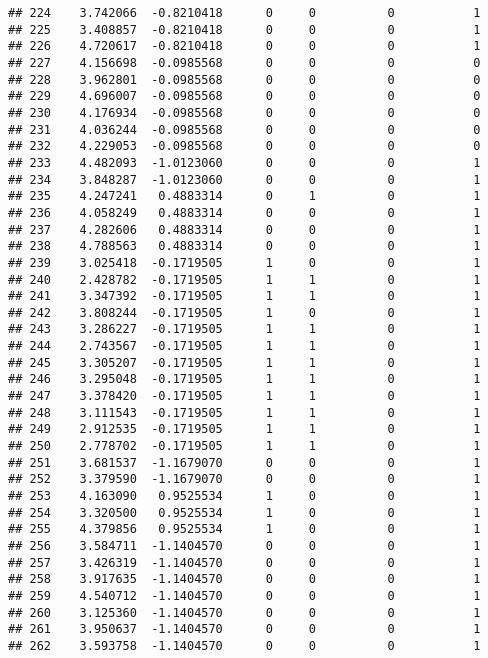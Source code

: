 \documentclass[
]{article}
\begin{document}
\begin{verbatim}
## 224    3.742066  -0.8210418      0     0          0           1
## 225    3.408857  -0.8210418      0     0          0           1
## 226    4.720617  -0.8210418      0     0          0           1
## 227    4.156698  -0.0985568      0     0          0           0
## 228    3.962801  -0.0985568      0     0          0           0
## 229    4.696007  -0.0985568      0     0          0           0
## 230    4.176934  -0.0985568      0     0          0           0
## 231    4.036244  -0.0985568      0     0          0           0
## 232    4.229053  -0.0985568      0     0          0           0
## 233    4.482093  -1.0123060      0     0          0           1
## 234    3.848287  -1.0123060      0     0          0           1
## 235    4.247241   0.4883314      0     1          0           1
## 236    4.058249   0.4883314      0     0          0           1
## 237    4.282606   0.4883314      0     0          0           1
## 238    4.788563   0.4883314      0     0          0           1
## 239    3.025418  -0.1719505      1     0          0           1
## 240    2.428782  -0.1719505      1     1          0           1
## 241    3.347392  -0.1719505      1     1          0           1
## 242    3.808244  -0.1719505      1     0          0           1
## 243    3.286227  -0.1719505      1     1          0           1
## 244    2.743567  -0.1719505      1     1          0           1
## 245    3.305207  -0.1719505      1     1          0           1
## 246    3.295048  -0.1719505      1     1          0           1
## 247    3.378420  -0.1719505      1     1          0           1
## 248    3.111543  -0.1719505      1     1          0           1
## 249    2.912535  -0.1719505      1     1          0           1
## 250    2.778702  -0.1719505      1     1          0           1
## 251    3.681537  -1.1679070      0     0          0           1
## 252    3.379590  -1.1679070      0     0          0           1
## 253    4.163090   0.9525534      1     0          0           1
## 254    3.320500   0.9525534      1     0          0           1
## 255    4.379856   0.9525534      1     0          0           1
## 256    3.584711  -1.1404570      0     0          0           1
## 257    3.426319  -1.1404570      0     0          0           1
## 258    3.917635  -1.1404570      0     0          0           1
## 259    4.540712  -1.1404570      0     0          0           1
## 260    3.125360  -1.1404570      0     0          0           1
## 261    3.950637  -1.1404570      0     0          0           1
## 262    3.593758  -1.1404570      0     0          0           1

\end{verbatim}
\end{document}
